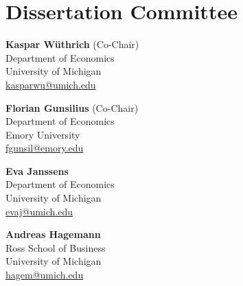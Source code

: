 \documentclass[11pt]{article}
\begin{document}
\section*{Dissertation Committee}
\noindent
\begin{minipage}[t]{0.47\textwidth}
\textbf{Kaspar W\"uthrich} (Co-Chair) \\
Department of Economics \\
University of Michigan \\
\href{mailto:kasparwu@umich.edu}{kasparwu@umich.edu}
\end{minipage}\hfill
\begin{minipage}[t]{0.47\textwidth}
\textbf{Florian Gunsilius} (Co-Chair) \\
Department of Economics \\
Emory University \\
\href{mailto:fgunsil@emory.edu}{fgunsil@emory.edu}
\end{minipage}

\vspace{1em}
\noindent
\begin{minipage}[t]{0.47\textwidth}
\textbf{Eva Janssens} \\
Department of Economics \\
University of Michigan \\
\href{mailto:evaj@umich.edu}{evaj@umich.edu}
\end{minipage}\hfill
\begin{minipage}[t]{0.47\textwidth}
\textbf{Andreas Hagemann} \\
Ross School of Business \\
University of Michigan \\
\href{mailto:hagem@umich.edu}{hagem@umich.edu}
\end{minipage}
\end{document}
